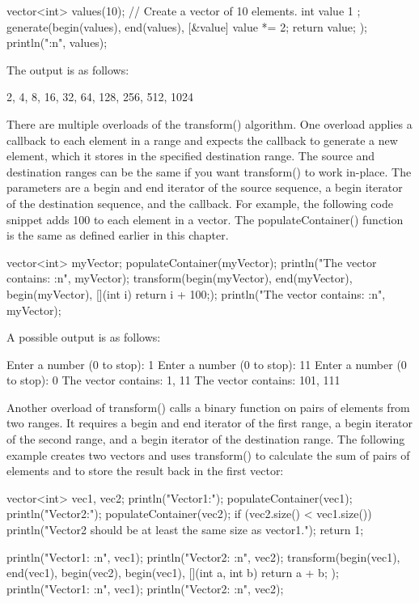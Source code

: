 \begin{cpp}
vector<int> values(10); // Create a vector of 10 elements.
int value { 1 };
generate(begin(values), end(values), [&value]{ value *= 2; return value; });
println("{:n}", values);
\end{cpp}

The output is as follows:

\begin{shell}
2, 4, 8, 16, 32, 64, 128, 256, 512, 1024
\end{shell}


There are multiple overloads of the transform() algorithm. One overload applies a callback to each element in a range and expects the callback to generate a new element, which it stores in the specified destination range. The source and destination ranges can be the same if you want transform() to work in-place. The parameters are a begin and end iterator of the source sequence, a begin iterator of the destination sequence, and the callback. For example, the following code snippet adds 100 to each element in a vector. The populateContainer() function is the same as defined earlier in this chapter.

\begin{cpp}
vector<int> myVector;
populateContainer(myVector);
println("The vector contains: {:n}", myVector);
transform(begin(myVector), end(myVector), begin(myVector),
    [](int i){ return i + 100;});
println("The vector contains: {:n}", myVector);
\end{cpp}

A possible output is as follows:

\begin{shell}
Enter a number (0 to stop): 1
Enter a number (0 to stop): 11
Enter a number (0 to stop): 0
The vector contains: 1, 11
The vector contains: 101, 111
\end{shell}

Another overload of transform() calls a binary function on pairs of elements from two ranges. It requires a begin and end iterator of the first range, a begin iterator of the second range, and a begin iterator of the destination range. The following example creates two vectors and uses transform() to calculate the sum of pairs of elements and to store the result back in the first vector:

\begin{cpp}
vector<int> vec1, vec2;
println("Vector1:"); populateContainer(vec1);
println("Vector2:"); populateContainer(vec2);
if (vec2.size() < vec1.size())
{
    println("Vector2 should be at least the same size as vector1.");
    return 1;
}

println("Vector1: {:n}", vec1);
println("Vector2: {:n}", vec2);
transform(begin(vec1), end(vec1), begin(vec2), begin(vec1),
    [](int a, int b){ return a + b; });
println("Vector1: {:n}", vec1);
println("Vector2: {:n}", vec2);
\end{cpp}

